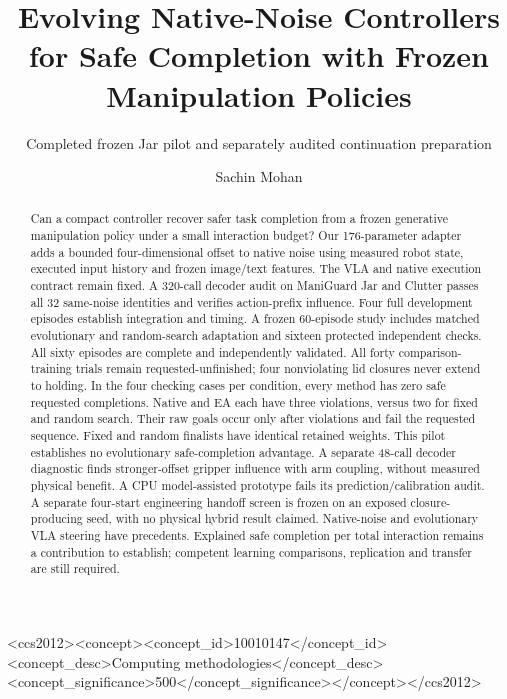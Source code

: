 \documentclass[sigconf,dvipsnames,balance=false]{acmart}
\begin{document}
\raggedbottom
\title{Evolving Native-Noise Controllers for Safe Completion with Frozen Manipulation Policies}
\subtitle{Completed frozen Jar pilot and separately audited continuation preparation}
\author{Sachin Mohan}
\renewcommand{\shortauthors}{Mohan}
\begin{abstract}
Can a compact controller recover safer task completion from a frozen generative
manipulation policy under a small interaction budget? Our 176-parameter adapter
adds a bounded four-dimensional offset to native noise using measured robot state,
executed input history and frozen image/text features. The VLA and native execution
contract remain fixed. A 320-call decoder audit on ManiGuard Jar and Clutter
passes all 32 same-noise identities and verifies action-prefix influence. Four
full development episodes establish integration and timing. A frozen 60-episode
study includes matched evolutionary and random-search adaptation and sixteen
protected independent checks. All sixty episodes are complete and independently
validated. All forty comparison-training trials remain requested-unfinished;
four nonviolating lid closures never extend to holding. In the four checking
cases per condition, every method has zero safe requested completions. Native and
EA each have three violations, versus two for fixed and random search. Their
raw goals occur only after violations and fail the requested sequence. Fixed and
random finalists have identical retained weights. This pilot establishes no
evolutionary safe-completion advantage. A separate 48-call
decoder diagnostic finds stronger-offset gripper influence with arm coupling,
without measured physical benefit. A CPU model-assisted prototype fails its
prediction/calibration audit. A separate four-start engineering handoff screen
is frozen on an exposed closure-producing seed, with no physical hybrid result
claimed. Native-noise and evolutionary VLA steering have precedents. Explained
safe completion per total interaction remains a contribution to establish; competent
learning comparisons, replication and transfer are still required.
\end{abstract}
\begin{CCSXML}
<ccs2012><concept><concept_id>10010147</concept_id>
<concept_desc>Computing methodologies</concept_desc>
<concept_significance>500</concept_significance></concept></ccs2012>
\end{CCSXML}
\maketitle
\end{document}

